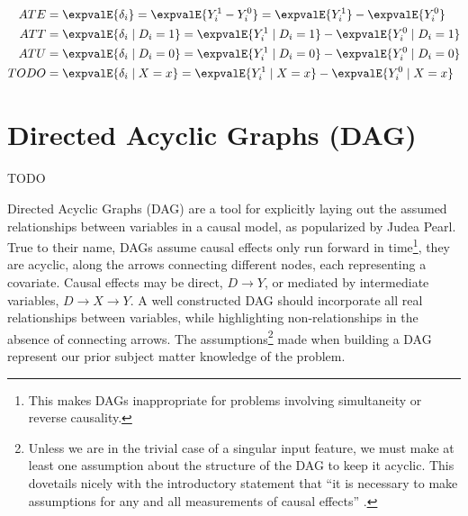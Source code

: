 \begin{subequations} \label{eq:cause:causal_measures}
\begin{align}
ATE &= \expvalE{\delta_{i}} = \expvalE{Y_{i}^{1} - Y_{i}^{0}} = \expvalE{Y_{i}^{1}} - \expvalE{Y_{i}^{0}} \label{eq:cause:causal_measures:ATE} \\
ATT &= \expvalE{\delta_{i} \mid D_{i} = 1} = \expvalE{Y_{i}^{1} \mid D_{i} = 1} - \expvalE{Y_{i}^{0} \mid D_{i} = 1} \label{eq:cause:causal_measures:ATT} \\
ATU &= \expvalE{\delta_{i} \mid D_{i} = 0} = \expvalE{Y_{i}^{1} \mid D_{i} = 0} - \expvalE{Y_{i}^{0} \mid D_{i} = 0} \label{eq:cause:causal_measures:ATU} \\
TODO &= \expvalE{\delta_{i} \mid X = x} = \expvalE{Y_{i}^{1} \mid X = x} - \expvalE{Y_{i}^{0} \mid X = x} \label{eq:cause:causal_measures:TODO}%
\end{align}
\end{subequations}

\section{Directed Acyclic Graphs (DAG)}
\label{cause:DAG}
TODO

Directed Acyclic Graphs (DAG) are a tool for
explicitly laying out the assumed relationships between variables
in a causal model, as popularized by Judea Pearl. %
True to their name, DAGs assume causal effects only run forward in time\footnote{This makes
DAGs inappropriate for problems involving simultaneity or reverse causality.}, \ie they are acyclic,
along the arrows connecting different nodes, each representing a covariate.
Causal effects may be direct, $D \to Y$, or mediated by intermediate variables, $D \to X \to Y$.
A well constructed DAG should incorporate all real relationships between variables,
while highlighting non-relationships in the absence of connecting arrows.
The \apriori assumptions\footnote{Unless we are in the trivial case of a singular input feature,
we must make at least one assumption about the structure of the DAG to keep it acyclic. %
This dovetails nicely with the introductory statement that
``it is necessary to make assumptions for any and all measurements of causal effects''
.} made when building a DAG represent our prior subject matter knowledge of the problem.

